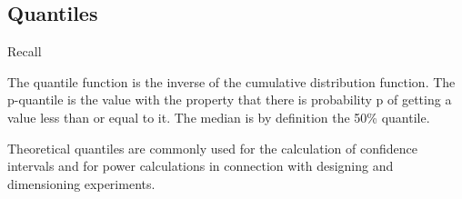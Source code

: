 
\subsection*{Quantiles}
Recall


The quantile function is the inverse of the cumulative
distribution function. The p-quantile is the value with the
property that there is probability p of getting a value less than
or equal to it. The median is by definition the 50\% quantile.


Theoretical quantiles are commonly used for the calculation of
confidence intervals and for power calculations in connection with
designing and dimensioning experiments.


